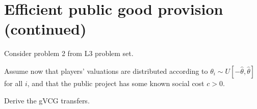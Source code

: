 \documentclass[a4paper]{article}
\begin{document}
%		
%		 
%		
%		



\section{Efficient public good provision (continued)}

Consider problem 2 from L3 problem set.

Assume now that players' valuations are distributed according to $\theta_i \sim U[-\hat{\theta},\hat{\theta}]$ for all $i$, and that the public project has some known social cost $c > 0$.

Derive the gVCG transfers.
\end{document}

